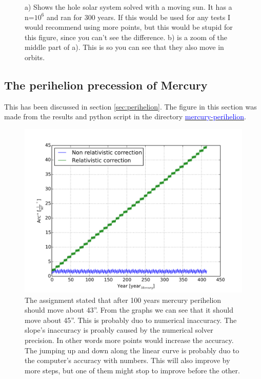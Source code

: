 \begin{figure}[H]
\begin{subfigure}{0.5\textwidth}
        \caption{}
    \end{subfigure}
    \caption{a) Shows the hole solar system solved with a moving sun. It has a n=$10^6$ and ran for 300 years. If this would be used for any tests I would recommend using more points, but this would be stupid for this figure, since you can't see the difference. b) is a zoom of the middle part of a). This is so you can see that they also move in orbits.}
    \label{fig:solarsystem-moving}
\end{figure}



\subsection{The perihelion precession of Mercury}

This has been discussed in section \ref{sec:perihelion}. The figure in this section was made from the results and python script in the directory \href{https://github.com/erikfsk/Project-3/tree/master/Project3/mercury-perihelion}{\textcolor{blue}{mercury-perihelion}}.


\begin{figure}[H]
    \centering
    \includegraphics[width=\linewidth]{result/bilder/perihelion.png}
    \caption{The assignment stated that after 100 years mercury perihelion should move about 43''. From the graphs we can see that it should move about 45''. This is probably duo to numerical inaccuracy. The slope's inaccuracy is proably caused by the numerical solver precision. In other words more points would increase the accuracy. The jumping up and down along the linear curve is probably duo to the computer's accuracy with numbers. This will also improve by more steps, but one of them might stop to improve before the other.}
    \label{fig:perihelion}
\end{figure}






